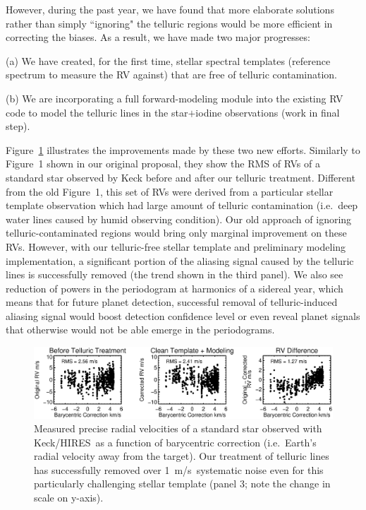 \documentclass[12pt]{article}
\def\mps{m/s}
\def\keck{Keck/HIRES}
\begin{document}
However, during the past year, we have found that more elaborate
solutions rather than simply ``ignoring" the telluric regions would
be more efficient in correcting the biases. As a result, we have made
two major progresses:

(a) We have created, for the first time, stellar spectral templates
(reference spectrum to measure the RV against) that are free of telluric contamination.

(b) We are incorporating a full forward-modeling module into the
existing RV code to model the telluric lines in the star$+$iodine
observations (work in final step).

Figure~\ref{fig:tell} illustrates the improvements made by these two
new efforts. Similarly to Figure~1 shown in our original proposal,
they show the RMS of RVs of a standard star observed by Keck before
and after our telluric treatment. Different from the old Figure~1,
this set of RVs were derived from a particular stellar template
observation which had large amount of telluric contamination
(i.e.\ deep water lines caused by humid observing condition). Our old
approach of ignoring telluric-contaminated regions would bring only
marginal improvement on these RVs. However, with our telluric-free
stellar template and preliminary modeling implementation, a
significant portion of the aliasing signal caused by the telluric
lines is successfully removed (the trend shown in the third panel). We
also see reduction of powers in the periodogram at harmonics of a
sidereal year, which means that for future planet detection,
successful removal of telluric-induced aliasing signal would boost
detection confidence level or even reveal planet signals that
otherwise would not be able emerge in the periodograms.

\begin{figure}[thb]
  \vspace{-3pt}
  \begin{center}
    \includegraphics[width=\textwidth]{185144_BC_RV_rj172_4panel}
  \end{center}
  \vspace{-25pt}  
  \caption{Measured precise radial velocities of a standard star
    observed with \keck\ as a function of barycentric correction
    (i.e.~Earth's radial velocity away from the target). Our
    treatment of telluric lines has successfully removed over
    1~\mps\ systematic noise even for this particularly challenging
    stellar template (panel 3; note the change in scale on
    y-axis).} 
  \vspace{-8pt}  
  \label{fig:tell}
\end{figure}
\end{document}
